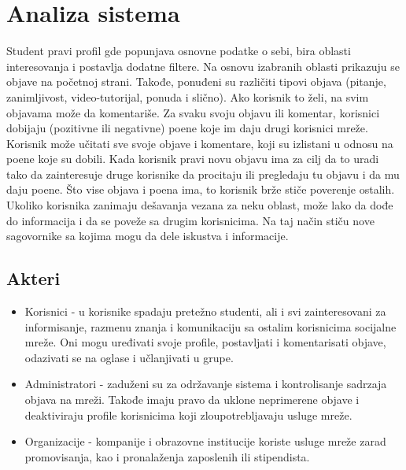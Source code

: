 \section{Analiza sistema}

Student pravi profil gde popunjava osnovne podatke o sebi, bira oblasti interesovanja i postavlja dodatne filtere. Na osnovu izabranih oblasti prikazuju se objave na početnoj strani. Takođe, ponuđeni
su različiti tipovi objava (pitanje, zanimljivost, video-tutorijal, ponuda i slično).
Ako korisnik to želi, na svim objavama može da komentariše.
Za svaku svoju objavu ili komentar, korisnici dobijaju (pozitivne ili negativne) poene koje im daju drugi korisnici mreže. Korisnik može
učitati sve svoje objave i komentare, koji su izlistani u odnosu na poene koje
su dobili. Kada korisnik pravi novu objavu ima za cilj da to uradi tako da
zainteresuje druge korisnike da procitaju ili pregledaju tu objavu i da mu
daju poene. Što vise objava i poena ima, to korisnik brže stiče poverenje
ostalih.
Ukoliko korisnika zanimaju dešavanja vezana za neku oblast, može lako da dođe do informacija i da se poveže sa drugim korisnicima. Na taj način stiču nove sagovornike sa kojima mogu da dele iskustva i informacije.

\subsection{Akteri}
\begin{itemize}
    \item Korisnici - u korisnike spadaju pretežno studenti, ali i svi zainteresovani za informisanje, razmenu znanja i komunikaciju sa ostalim korisnicima socijalne mreže. Oni mogu uređivati svoje profile, postavljati i komentarisati objave, odazivati se na oglase i učlanjivati u grupe.
    \item Administratori - zaduženi su za održavanje sistema i kontrolisanje sadrzaja objava na mreži. Takođe imaju pravo da uklone neprimerene objave i deaktiviraju profile korisnicima koji zloupotrebljavaju usluge mreže.
    \item Organizacije - kompanije i obrazovne institucije koriste usluge mreže zarad promovisanja, kao i  pronalaženja zaposlenih ili stipendista.
\end{itemize}

